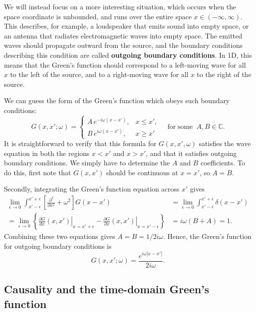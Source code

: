 \documentclass[10pt,a4paper]{article}
\begin{document}
We will instead focus on a more interesting situation, which occurs when
the space coordinate is unbounded, and runs over the entire space
$x \in (-\infty, \infty)$. This describes, for example, a loudspeaker
that emits sound into empty space, or an antenna that radiates
electromagnetic waves into empty space. The emitted waves should
propagate outward from the source, and the boundary conditions
describing this condition are called \textbf{outgoing boundary
conditions}. In 1D, this means that the Green's function should
correspond to a left-moving wave for all $x$ to the left of the
source, and to a right-moving wave for all $x$ to the right of the
source.

We can guess the form of the Green's function which obeys such boundary
conditions:
\begin{equation}
G(x,x';\omega) = \left\{\begin{array}{ll}A \, e^{-i\omega (x-x')}, & x \le x', \\ B \, e^{i\omega (x-x')}, & x \ge x'\end{array}\right. \quad \mathrm{for}\;\mathrm{some}\;\; A, B \in \mathbb{C}.
\end{equation}
It is straightforward to verify that this formula for $G(x,x',\omega)$
satisfies the wave equation in both the regions $x < x'$ and
$x > x'$, and that it satisfies outgoing boundary conditions. We
simply have to determine the $A$ and $B$ coefficients. To do this,
first note that $G(x,x')$ should be continuous at $x = x'$, so
$A = B$.

Secondly, integrating the Green's function equation across $x'$ gives
\begin{align}
  \lim_{\epsilon \rightarrow 0} \int_{x'-\epsilon}^{x'+\epsilon} \left[\frac{\partial^2}{\partial x^2} + \omega^2\right]G(x-x') &= \lim_{\epsilon \rightarrow 0} \int_{x'-\epsilon}^{x'+\epsilon} \delta(x-x') \\ = \lim_{\epsilon \rightarrow 0} \left\{ \left.\frac{\partial G}{dx} (x,x') \right|_{x = x'+\epsilon} - \left.\frac{\partial G}{\partial x} (x,x') \right|_{x = x'-\epsilon}\right\} &= i\omega (B + A) = 1.
\end{align}
Combining these two equations gives $A = B = 1/2i\omega$. Hence, the
Green's function for outgoing boundary conditions is
\begin{equation}
G(x,x';\omega) = \frac{e^{i\omega |x-x'|}}{2i\omega}.
\end{equation}

\subsection{Causality and the time-domain Green's function}
\label{causality-and-the-time-domain-greens-function}
\end{document}
